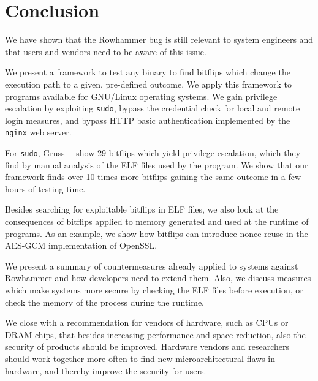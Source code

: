 \chapter{Conclusion}\label{sec:conclusion}

We have shown that the Rowhammer bug is still relevant to system
engineers and that users and vendors need to be aware of this issue.

We present a framework to test any binary to find bitflips which change the
execution path to a given, pre-defined outcome. We apply this framework to
programs available for GNU/Linux operating systems. We gain privilege
escalation by exploiting \texttt{sudo}, bypass the credential check for local
and remote login measures, and bypass HTTP basic authentication implemented by
the \texttt{nginx} web server.

For \texttt{sudo}, Gruss~\etal~\cite{flipinthewall} show \num{29} bitflips which
yield privilege escalation, which they find by manual analysis of the ELF files
used by the program. We show that our framework finds over \num{10} times more
bitflips gaining the same outcome in a few hours of testing time.

Besides searching for exploitable bitflips in ELF files, we also look at the
consequences of bitflips applied to memory generated and used at the runtime of
programs. As an example, we show how bitflips can introduce nonce reuse in the
AES-GCM implementation of OpenSSL.

We present a summary of countermeasures already applied to systems against
Rowhammer and how developers need to extend them. Also, we discuss measures
which make systems more secure by checking the ELF files before
execution, or check the memory of the process during the runtime.

We close with a recommendation for vendors of hardware, such as CPUs or DRAM
chips, that besides increasing performance and space reduction, also the
security of products should be improved. Hardware vendors and researchers should
work together more often to find new microarchitectural flaws in hardware, and
thereby improve the security for users.

